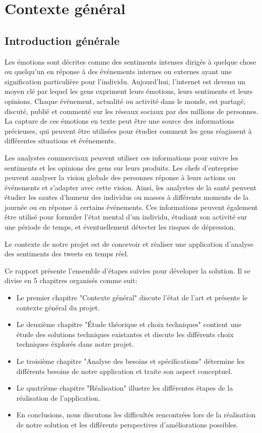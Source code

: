 \chapter{Contexte général}
\section{Introduction générale}
Les émotions sont décrites comme des sentiments intenses dirigés à quelque chose ou quelqu'un en réponse à des événements internes ou externes ayant une signification particulière pour l'individu. Aujourd'hui, l'internet est devenu un moyen clé par lequel les gens expriment leurs émotions, leurs sentiments et leurs opinions. Chaque événement, actualité ou activité dans le monde, est partagé, discuté, publié et commenté sur les réseaux sociaux par des millions de personnes. La capture de ces émotions en texte peut être une source des informations précieuses, qui peuvent être utilisées pour étudier comment les gens réagissent à différentes situations et événements.

Les analystes commerciaux peuvent utiliser ces informations pour suivre les sentiments et les opinions des gens sur leurs produits. Les chefs d’entreprise peuvent analyser la vision globale des personnes réponse à leurs actions ou événements et s'adapter avec cette vision. Ainsi, les analystes de la santé peuvent étudier les sautes d'humeur des individus ou
masses à différents moments de la journée ou en réponse à certains événements. Ces informations peuvent également être utilisé pour formuler l'état mental d'un individu, étudiant son activité sur une période de temps, et éventuellement détecter les risques de dépression.

Le contexte de notre projet est de concevoir et réaliser une application d'analyse des sentiments des tweets en temps réel.

Ce rapport présente l'ensemble d'étapes suivies pour déveloper la solution. Il se divise en 5 chapitres organisés comme suit:
\begin{itemize}
    \item Le premier chapitre "Contexte général" discute l'état de l'art et présente le contexte général du projet.
    \item Le deuxième chapitre "Étude théorique et choix techniques" contient une étude des solutions techniques existantes et discute les différents choix techniques éxplorés dans notre projet.
    \item Le troisième chapitre "Analyse des besoins et spécifications" détermine les différents besoins de notre application et traite son aspect conceptuel.
    \item Le quatrième chapitre "Réalisation" illustre les différentes étapes de la réalisation de l'application.
    \item En conclusions, nous discutons les difficultés rencontrées lors de la réalisation de notre solution et les différents perspectives d'améliorations possibles.
\end{itemize}

